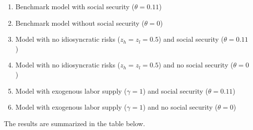 \documentclass[12pt]{article}
\begin{document}
\begin{enumerate}
    \item Benchmark model with social security ($\theta = 0.11$)
    \item Benchmark model without social security ($\theta = 0$)
    \item Model with no idiosyncratic risks ($z_h = z_l = 0.5$) and social security ($\theta = 0.11$)
    \item Model with no idiosyncratic risks ($z_h = z_l = 0.5$) and no social security ($\theta = 0$)
    \item Model with exogenous labor supply ($\gamma = 1$) and social security ($\theta = 0.11$)
    \item Model with exogenous labor supply ($\gamma = 1$) and no social security ($\theta = 0$)
\end{enumerate}
\pagebreak
The results are summarized in the table below. 
\begin{center}

\end{center}
\end{document}
